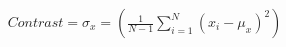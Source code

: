 \documentclass[preview]{standalone}
\begin{document}
\begin{align*}
Contrast = \sigma_x = \left(\frac{1}{N-1}\sum_{i=1}^{N}(x_i - \mu_x)^2\right)
\end{align*}
\end{document}
